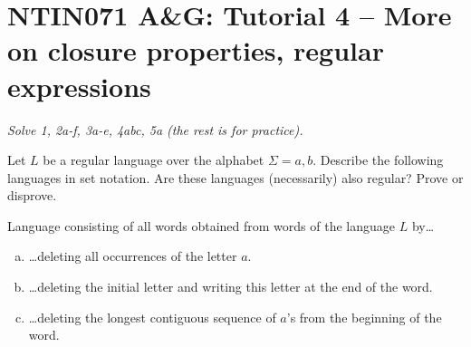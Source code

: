\documentclass[a4paper,12pt]{amsart}
\begin{document}

\section*{NTIN071 A\&G: Tutorial 4 -- More on closure properties, regular expressions}


\medskip

\noindent\emph{Solve 1, 2a-f, 3a-e, 4abc, 5a (the rest is for practice).}

\medskip


\medskip\begin{problem}[Delete]
    
    Let $L$ be a regular language over the alphabet $\Sigma={a,b}$. Describe the following languages in set notation. Are these languages (necessarily) also regular? Prove or disprove.
    
    \medskip

    Language consisting of all words obtained from words of the language $L$ by\dots

    \medskip

    \begin{enumerate}[(a)]\setlength\itemsep{12pt} 
        \item \dots deleting all occurrences of the letter $a$. 
        \item \dots deleting the initial letter and writing this letter at the end of the word. 
        \item \dots deleting the longest contiguous sequence of $a$'s from the beginning of the word. 
    \end{enumerate}

\end{problem}
\end{document}
